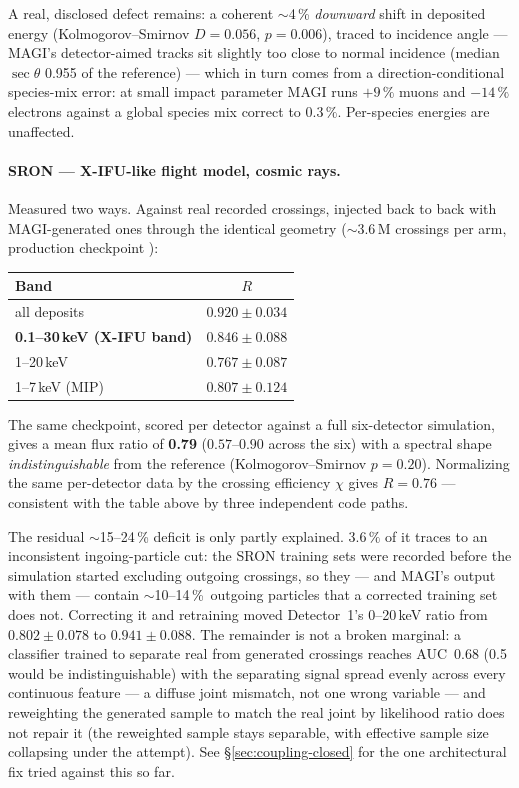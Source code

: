 \documentclass[11pt,a4paper]{article}
\begin{document}
A real, disclosed defect remains: a coherent $\sim$4\,\% \emph{downward} shift
in deposited energy (Kolmogorov--Smirnov $D=0.056$, $p=0.006$), traced to
incidence angle --- MAGI's detector-aimed tracks sit slightly too close to
normal incidence (median $\sec\theta$ 0.955 of the reference) --- which in turn
comes from a direction-conditional species-mix error: at small impact
parameter MAGI runs $+9\,\%$ muons and $-14\,\%$ electrons against a global
species mix correct to $0.3\,\%$. Per-species energies are unaffected.

\paragraph{SRON --- X-IFU-like flight model, cosmic rays.} Measured two ways.
Against real recorded crossings, injected back to back with MAGI-generated
ones through the identical geometry ($\sim$3.6\,M crossings per arm, production
checkpoint ):

\begin{center}
\begin{tabular}{@{}lc@{}}
\toprule
\textbf{Band} & \textbf{$R$} \\
\midrule
all deposits                       & $0.920 \pm 0.034$ \\
\textbf{0.1--30\,keV (X-IFU band)} & $\mathbf{0.846 \pm 0.088}$ \\
1--20\,keV                         & $0.767 \pm 0.087$ \\
1--7\,keV (MIP)                    & $0.807 \pm 0.124$ \\
\bottomrule
\end{tabular}
\end{center}

The same checkpoint, scored per detector against a full six-detector
simulation, gives a mean flux ratio of \textbf{0.79} ($0.57$--$0.90$ across the
six) with a spectral shape \emph{indistinguishable} from the reference
(Kolmogorov--Smirnov $p=0.20$). Normalizing the same per-detector data by the
crossing efficiency $\chi$ gives $R=0.76$ --- consistent with the table above
by three independent code paths.

The residual $\sim$15--24\,\% deficit is only partly explained. $3.6\,\%$ of it
traces to an inconsistent ingoing-particle cut: the SRON training sets were
recorded before the simulation started excluding outgoing crossings, so they
--- and MAGI's output with them --- contain $\sim$10--14\,\%~outgoing particles
that a corrected training set does not. Correcting it and retraining moved
Detector~1's 0--20\,keV ratio from $0.802 \pm 0.078$ to $0.941 \pm 0.088$. The
remainder is not a broken marginal: a classifier trained to separate real from
generated crossings reaches AUC~0.68 (0.5 would be indistinguishable) with the
separating signal spread evenly across every continuous feature --- a diffuse
joint mismatch, not one wrong variable --- and reweighting the generated
sample to match the real joint by likelihood ratio does not repair it (the
reweighted sample stays separable, with effective sample size collapsing under
the attempt). See \S\ref{sec:coupling-closed} for the one architectural fix
tried against this so far.
\end{document}
